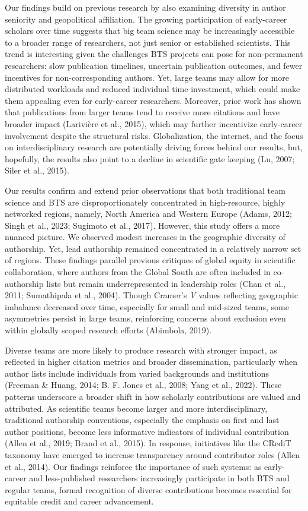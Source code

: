 \documentclass[
  man,floatsintext]{apa7}
\begin{document}
Our findings build on previous research by also examining diversity in
author seniority and geopolitical affiliation. The growing participation
of early-career scholars over time suggests that big team science may be
increasingly accessible to a broader range of researchers, not just
senior or established scientists. This trend is interesting given the
challenges BTS projects can pose for non-permanent researchers: slow
publication timelines, uncertain publication outcomes, and fewer
incentives for non-corresponding authors. Yet, large teams may allow for
more distributed workloads and reduced individual time investment, which
could make them appealing even for early-career researchers. Moreover,
prior work has shown that publications from larger teams tend to receive
more citations and have broader impact (Larivière et al., 2015), which may
further incentivize early-career involvement despite the structural
risks. Globalization, the internet, and the focus on interdisciplinary
research are potentially driving forces behind our results, but,
hopefully, the results also point to a decline in scientific gate keeping
(Lu, 2007; Siler et al., 2015).

Our results confirm and extend prior observations that both traditional team science
and BTS are disproportionately concentrated in high-resource, highly
networked regions, namely, North America and Western Europe (Adams, 2012; Singh et al., 2023; Sugimoto et al., 2017). However, this study offers a more nuanced
picture. We observed modest increases in the geographic diversity of
authorship. Yet, lead authorship remained concentrated in a relatively
narrow set of regions. These findings parallel previous critiques of
global equity in scientific collaboration, where authors from the Global
South are often included in co-authorship lists but remain
underrepresented in leadership roles (Chan et al., 2011; Sumathipala et al., 2004).
Though Cramer's \emph{V} values reflecting geographic imbalance decreased
over time, especially for small and mid-sized teams, some asymmetries
persist in large teams, reinforcing concerns about exclusion even within
globally scoped research efforts (Abimbola, 2019).

Diverse teams are more likely to produce research with stronger impact,
as reflected in higher citation metrics and broader dissemination,
particularly when author lists include individuals from varied
backgrounds and institutions (Freeman \& Huang, 2014; B. F. Jones et al., 2008; Yang et al., 2022).
These patterns underscore a broader shift in how scholarly contributions
are valued and attributed. As scientific teams become larger and more
interdisciplinary, traditional authorship conventions, especially the
emphasis on first and last author positions, become less informative
indicators of individual contribution (Allen et al., 2019; Brand et al., 2015). In
response, initiatives like the CRediT taxonomy have emerged to increase
transparency around contributor roles (Allen et al., 2014). Our findings
reinforce the importance of such systems: as early-career and
less-published researchers increasingly participate in both BTS and
regular teams, formal recognition of diverse contributions becomes
essential for equitable credit and career advancement.
\end{document}
